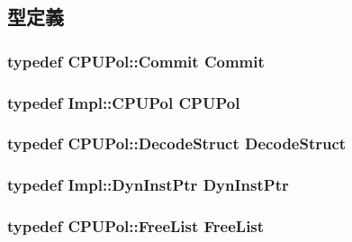 \subsection{型定義}
\hypertarget{classDefaultRename_a05a26def5ee77f19d25b86079d161ebd}{
\subsubsection[{Commit}]{\setlength{\rightskip}{0pt plus 5cm}typedef CPUPol::Commit {\bf Commit}}}
\label{classDefaultRename_a05a26def5ee77f19d25b86079d161ebd}
\hypertarget{classDefaultRename_a87d662eaeb9eab249d671b63cb4ba11a}{
\subsubsection[{CPUPol}]{\setlength{\rightskip}{0pt plus 5cm}typedef Impl::CPUPol {\bf CPUPol}}}
\label{classDefaultRename_a87d662eaeb9eab249d671b63cb4ba11a}
\hypertarget{classDefaultRename_a38077cd156cf219016abf92d8c5b523b}{
\subsubsection[{DecodeStruct}]{\setlength{\rightskip}{0pt plus 5cm}typedef CPUPol::DecodeStruct {\bf DecodeStruct}}}
\label{classDefaultRename_a38077cd156cf219016abf92d8c5b523b}
\hypertarget{classDefaultRename_a028ce10889c5f6450239d9e9a7347976}{
\subsubsection[{DynInstPtr}]{\setlength{\rightskip}{0pt plus 5cm}typedef Impl::DynInstPtr {\bf DynInstPtr}}}
\label{classDefaultRename_a028ce10889c5f6450239d9e9a7347976}
\hypertarget{classDefaultRename_ab784c356bacd490590fba42443e0f786}{
\subsubsection[{FreeList}]{\setlength{\rightskip}{0pt plus 5cm}typedef CPUPol::FreeList {\bf FreeList}}}
